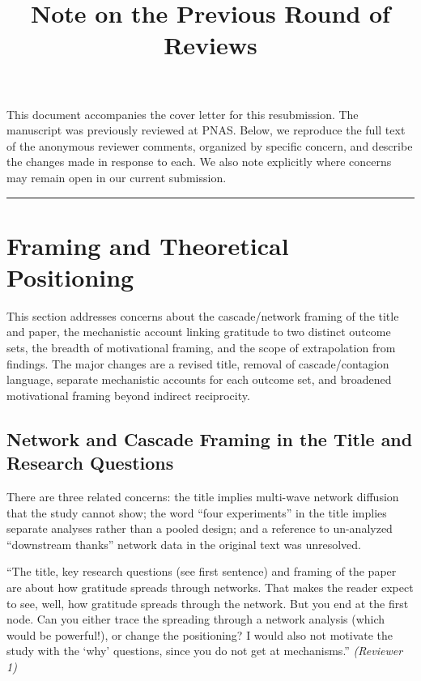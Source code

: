 \documentclass[12pt]{article}
\title{\textbf{Note on the Previous Round of Reviews}}
\author{}
\date{}
\newenvironment{reviewquote}{%
  \def\FrameCommand{{\color{quotebarcolor}\vrule width 2pt}\colorbox{quotebg}}%
  \MakeFramed{\advance\hsize-\width \FrameRestore}%
  \small
}{%
  \endMakeFramed
}
\newcommand{\sectionnote}[1]{\par\smallskip#1\par\medskip}
\begin{document}
\maketitle

This document accompanies the cover letter for this resubmission. The manuscript was previously reviewed at PNAS. Below, we reproduce the full text of the anonymous reviewer comments, organized by specific concern, and describe the changes made in response to each. We also note explicitly where concerns may remain open in our current submission.

\bigskip
\hrule
\bigskip

\section{Framing and Theoretical Positioning}

This section addresses concerns about the cascade/network framing of the title and paper, the mechanistic account linking gratitude to two distinct outcome sets, the breadth of motivational framing, and the scope of extrapolation from findings. The major changes are a revised title, removal of cascade/contagion language, separate mechanistic accounts for each outcome set, and broadened motivational framing beyond indirect reciprocity.

\subsection{Network and Cascade Framing in the Title and Research Questions}

\sectionnote{There are three related concerns: the title implies multi-wave network diffusion that the study cannot show; the word ``four experiments'' in the title implies separate analyses rather than a pooled design; and a reference to un-analyzed ``downstream thanks'' network data in the original text was unresolved.}

\begin{reviewquote}
``The title, key research questions (see first sentence) and framing of the paper are about how gratitude spreads through networks. That makes the reader expect to see, well, how gratitude spreads through the network. But you end at the first node. Can you either trace the spreading through a network analysis (which would be powerful!), or change the positioning? I would also not motivate the study with the `why' questions, since you do not get at mechanisms.'' \textit{(Reviewer 1)}
\end{reviewquote}
\end{document}
